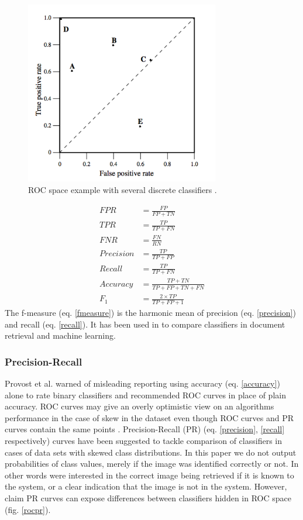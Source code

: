 \documentclass[english,12pt,a4paper,pdftex,elec,utf8, table]{aaltothesis}
\begin{document}
\begin{figure}[htb]
\begin{center}
\includegraphics[height=8cm]{figures/ROC}
\end{center}
\caption{ROC space example with several discrete classifiers \cite{Fawcett2006}. }
\label{figrocspace}
\end{figure}

\setlength{\jot}{10pt}
\begin{align}
FPR &= \frac{FP}{FP + TN}\label{FPR}\\
TPR &= \frac{TP}{TP + FN}\label{TPR}\\
FNR &= \frac{FN}{RN}\label{FNR}\\
Precision &= \frac{TP}{TP + FP}\label{precision}\\
Recall &= \frac{TP}{TP + FN}\label{recall}\\
Accuracy &= \frac{TP +TN}{TP + FP + TN + FN}\label{accuracy}\\
F_1 &= \frac{2 \times TP}{TP + FP + 1}\label{fmeasure}
\end{align}
The f-measure (eq. \ref{fmeasure}) is the harmonic mean of precision (eq. \ref{precision}) and recall (eq. \ref{recall}). It has been used in to compare classifiers in document retrieval and machine learning.

\subsubsection{Precision-Recall}\label{PRSection}
Provost et al. warned of misleading reporting using accuracy (eq. \ref{accuracy}) alone to rate binary classifiers \cite{Provost1997} and recommended ROC curves in place of plain accuracy. ROC curves may give an overly optimistic view on an algorithms performance in the case of skew in the dataset even though ROC curves and PR curves contain the same points \cite{Davis2006}. Precision-Recall (PR) (eq. \ref{precision}, \ref{recall} respectively) curves have been suggested \cite{craven2005markov} to tackle comparison of classifiers in cases of data sets with skewed class distributions. In this paper we do not output probabilities of class values, merely if the image was identified correctly or not. In other words were interested in the correct image being retrieved if it is known to the system, or a clear indication that the image is not in the system. However, \cite{Davis2006} claim PR curves can expose differences between classifiers hidden in ROC space (fig. \ref{rocpr}).
\end{document}

